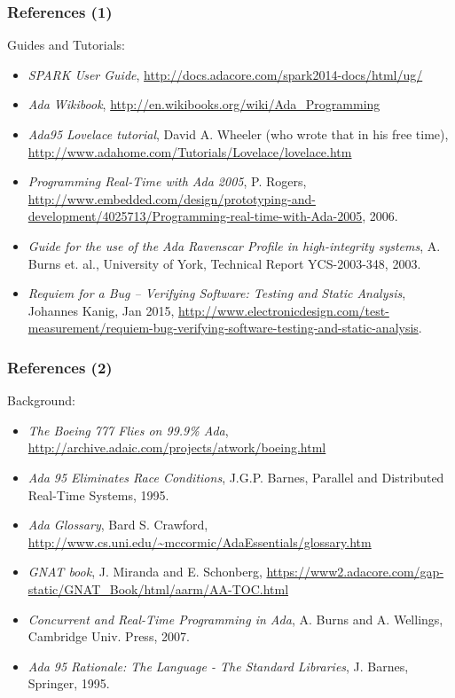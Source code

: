 \begin{frame}\frametitle{References (1)}
Guides and Tutorials:
{\scriptsize
  \begin{itemize}
  \item \emph{SPARK User Guide}, \url{http://docs.adacore.com/spark2014-docs/html/ug/}
  \item \emph{Ada Wikibook}, \url{http://en.wikibooks.org/wiki/Ada_Programming}
  \item \emph{Ada95 Lovelace tutorial}, David A. Wheeler (who wrote that in his free time), \url{http://www.adahome.com/Tutorials/Lovelace/lovelace.htm}
  \item \emph{Programming Real-Time with Ada 2005}, P. Rogers, \url{http://www.embedded.com/design/prototyping-and-development/4025713/Programming-real-time-with-Ada-2005}, 2006.
  \item \emph{Guide for the use of the Ada Ravenscar Profile in high-integrity systems}, A. Burns et. al., University of York, Technical Report YCS-2003-348, 2003.
  \item \emph{Requiem for a Bug – Verifying Software: Testing and Static Analysis}, Johannes Kanig, Jan 2015, \url{http://www.electronicdesign.com/test-measurement/requiem-bug-verifying-software-testing-and-static-analysis}.
  \end{itemize}
}
\end{frame}

\begin{frame}\frametitle{References (2)}
Background:
{\scriptsize
  \begin{itemize}
  \item \emph{The Boeing 777 Flies on 99.9\% Ada}, \url{http://archive.adaic.com/projects/atwork/boeing.html}
  \item \emph{Ada 95 Eliminates Race Conditions}, J.G.P. Barnes, Parallel and Distributed Real-Time Systems, 1995.
  \item \emph{Ada Glossary}, Bard S. Crawford, \url{http://www.cs.uni.edu/~mccormic/AdaEssentials/glossary.htm}
  \item \emph{GNAT book}, J. Miranda and E. Schonberg, \url{https://www2.adacore.com/gap-static/GNAT_Book/html/aarm/AA-TOC.html}
  \item \emph{Concurrent and Real-Time Programming in Ada}, A. Burns and A. Wellings, Cambridge Univ. Press, 2007.
  \item \emph{Ada 95 Rationale: The Language - The Standard Libraries}, J. Barnes, Springer, 1995.
  \end{itemize}
}
\end{frame}


